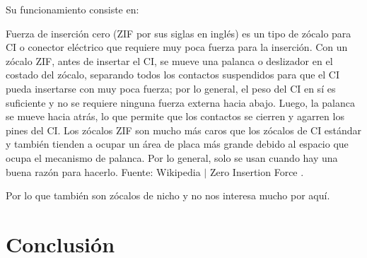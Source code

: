 \documentclass[conference]{IEEEtran}
\begin{document}
\bigbreak

Su funcionamiento consiste en:

\bigbreak

\begin{displayquote}
    Fuerza de inserción cero (ZIF por sus siglas en inglés) es un tipo de zócalo para CI o conector eléctrico que requiere muy poca fuerza para la inserción. Con un zócalo ZIF, antes de insertar el CI, se mueve una palanca o deslizador en el costado del zócalo, separando todos los contactos suspendidos para que el CI pueda insertarse con muy poca fuerza; por lo general, el peso del CI en sí es suficiente y no se requiere ninguna fuerza externa hacia abajo. Luego, la palanca se mueve hacia atrás, lo que permite que los contactos se cierren y agarren los pines del CI. Los zócalos ZIF son mucho más caros que los zócalos de CI estándar y también tienden a ocupar un área de placa más grande debido al espacio que ocupa el mecanismo de palanca. Por lo general, solo se usan cuando hay una buena razón para hacerlo.
    \small
    Fuente: Wikipedia $\mid$ Zero Insertion Force \cite{wikipedia-zif-2021}.
\end{displayquote}

\bigbreak

Por lo que también son zócalos de nicho y no nos interesa mucho por aquí.

\section{Conclusión}

\printbibliography
\end{document}
